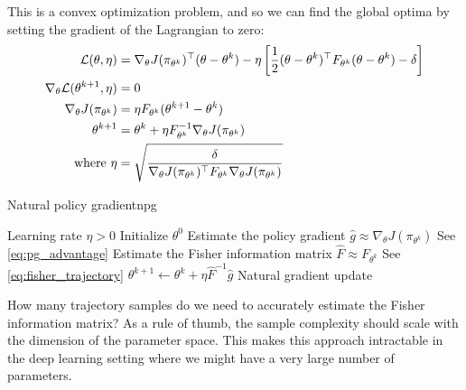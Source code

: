 \documentclass[\main/main]{subfiles}
\begin{document}
This is a convex optimization problem, and so we can find the global optima by setting the gradient of the Lagrangian to zero:
\begin{align*}
    \mathcal{L}(\theta, \eta)                     & = \nabla_\theta J(\pi_{\theta^k})^\top (\theta - \theta^k) - \eta \left[ \frac{1}{2} (\theta - \theta^k)^\top F_{\theta^k} (\theta - \theta^k) - \delta \right] \\
    \nabla_\theta \mathcal{L}(\theta^{k+1}, \eta) & = 0                                                                                                                                                             \\
    \nabla_\theta J(\pi_{\theta^k})        & = \eta F_{\theta^k} (\theta^{k+1} - \theta^k)                                                                                                                   \\
    \theta^{k+1}                           & = \theta^k + \eta F_{\theta^k}^{-1} \nabla_\theta J(\pi_{\theta^k})                                                                                             \\
    \text{where } \eta                     & = \sqrt{\frac{\delta}{\nabla_\theta J(\pi_{\theta^k})^\top F_{\theta^k} \nabla_\theta J(\pi_{\theta^k})}}
\end{align*}

\begin{definition}{Natural policy gradient}{npg}
    \begin{algorithmic}
        \Require Learning rate $\eta > 0$
        \State Initialize $\theta^0$
        \State Estimate the policy gradient $\hat g \approx \nabla_\theta J(\pi_{\theta^k})$
        \Comment See \eqref{eq:pg_advantage}
        \State Estimate the Fisher information matrix $\hat F \approx F_{\theta^k}$
        \Comment See \eqref{eq:fisher_trajectory}
        \State $\theta^{k+1} \gets \theta^k + \eta \hat F^{-1} \hat g$
        \Comment Natural gradient update
        \EndFor
    \end{algorithmic}

    How many trajectory samples do we need to accurately estimate the Fisher information matrix? As a rule of thumb, the sample complexity should scale with the dimension of the parameter space. This makes this approach intractable in the deep learning setting where we might have a very large number of parameters.
\end{definition}
\end{document}
